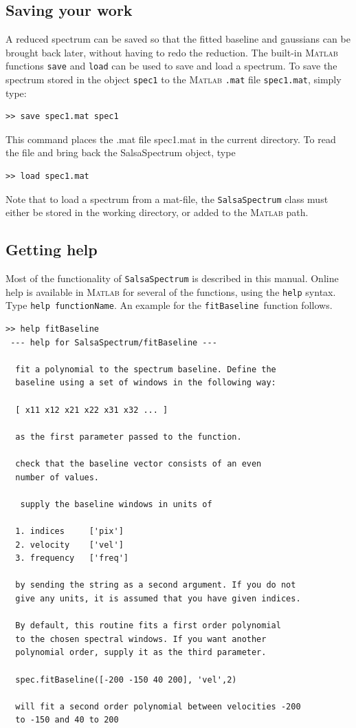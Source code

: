 \documentclass[11pt,a4paper]{article}
\begin{document}
\subsection{Saving your work}
\label{sec:saving-your-work}

A reduced spectrum can be saved so that the fitted baseline and
gaussians can be brought back later, without having to redo the
reduction. The built-in \textsc{Matlab} functions \texttt{save} and
\texttt{load} can be used to save and load a spectrum. To save the
spectrum stored in the object \texttt{spec1} to the
\textsc{\textsc{Matlab}} \texttt{.mat} file \texttt{spec1.mat}, simply
type:
\begin{lstlisting}
>> save spec1.mat spec1
\end{lstlisting}
This command places the .mat file spec1.mat in the current
directory. To read the file and bring back the SalsaSpectrum object,
type
\begin{lstlisting}
>> load spec1.mat
\end{lstlisting}
Note that to load a spectrum from a mat-file, the \texttt{SalsaSpectrum} class
must either be stored in the working directory, or added to the \textsc{Matlab}
path.

\subsection{Getting help}
\label{sec:getting-help}

Most of the functionality of \texttt{SalsaSpectrum} is described in
this manual. Online help is available in \textsc{\textsc{Matlab}} for several of the
functions, using the \texttt{help} syntax. Type \texttt{help
  functionName}. An example for the \texttt{fitBaseline}~function
follows.

\begin{lstlisting}
>> help fitBaseline
 --- help for SalsaSpectrum/fitBaseline ---

  fit a polynomial to the spectrum baseline. Define the
  baseline using a set of windows in the following way:
 
  [ x11 x12 x21 x22 x31 x32 ... ]
 
  as the first parameter passed to the function.
 
  check that the baseline vector consists of an even
  number of values.
 
   supply the baseline windows in units of
 
  1. indices     ['pix']
  2. velocity    ['vel']
  3. frequency   ['freq']
 
  by sending the string as a second argument. If you do not
  give any units, it is assumed that you have given indices.
 
  By default, this routine fits a first order polynomial
  to the chosen spectral windows. If you want another
  polynomial order, supply it as the third parameter.
 
  spec.fitBaseline([-200 -150 40 200], 'vel',2)
  
  will fit a second order polynomial between velocities -200
  to -150 and 40 to 200
\end{lstlisting}
\end{document}
